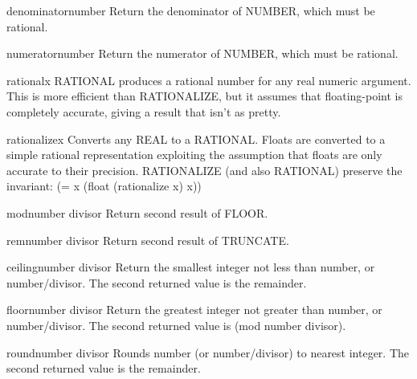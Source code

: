 \begin{function}{denominator}{number}{}{}
  Return the denominator of NUMBER, which must be rational.
\end{function}

\begin{function}{numerator}{number}{}{}
  Return the numerator of NUMBER, which must be rational.
\end{function}

\begin{function}{rational}{x}{}{}
  RATIONAL produces a rational number for any real numeric argument. This is
  more efficient than RATIONALIZE, but it assumes that floating-point is
  completely accurate, giving a result that isn't as pretty.
\end{function}

\begin{function}{rationalize}{x}{}{}
  Converts any REAL to a RATIONAL.  Floats are converted to a simple rational
  representation exploiting the assumption that floats are only accurate to
  their precision.  RATIONALIZE (and also RATIONAL) preserve the invariant:
      (= x (float (rationalize x) x))
\end{function}

\begin{function}{mod}{number divisor}{}{}
  Return second result of FLOOR.
\end{function}

\begin{function}{rem}{number divisor}{}{}
  Return second result of TRUNCATE.
\end{function}

\begin{function}{ceiling}{number \op divisor}{}{}
  Return the smallest integer not less than number, or number/divisor.
  The second returned value is the remainder.
\end{function}

\begin{function}{floor}{number \op divisor}{}{}
  Return the greatest integer not greater than number, or number/divisor.
  The second returned value is (mod number divisor).
\end{function}

\begin{function}{round}{number \op divisor}{}{}
  Rounds number (or number/divisor) to nearest integer.
  The second returned value is the remainder.
\end{function}

